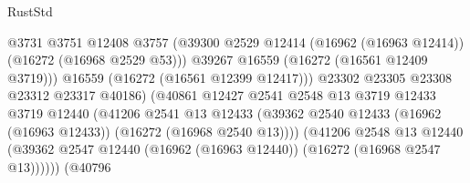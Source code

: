 \begin{lexlean}{RustStd}
\begin{coremodule}
                                              @3731
                                              @3751
                                              @12408
                                              @3757
                                              (@39300
                                                @2529
                                                @12414
                                                (@16962 (@16963 @12414))
                                                (@16272 (@16968 @2529 @53)))
                                              @39267
                                              @16559
                                              (@16272 (@16561 @12409 @3719)))
                                            @16559
                                            (@16272 (@16561 @12399 @12417)))
                                          @23302
                                          @23305
                                          @23308
                                          @23312
                                          @23317
                                          @40186)
                                        (@40861
                                          @12427
                                          @2541
                                          @2548
                                          @13
                                          @3719
                                          @12433
                                          @3719
                                          @12440
                                          (@41206
                                            @2541
                                            @13
                                            @12433
                                            (@39362
                                              @2540
                                              @12433
                                              (@16962 (@16963 @12433))
                                              (@16272 (@16968 @2540 @13))))
                                          (@41206
                                            @2548
                                            @13
                                            @12440
                                            (@39362
                                              @2547
                                              @12440
                                              (@16962 (@16963 @12440))
                                              (@16272 (@16968 @2547 @13))))))
                                      (@40796

\end{coremodule}
\end{lexlean}
